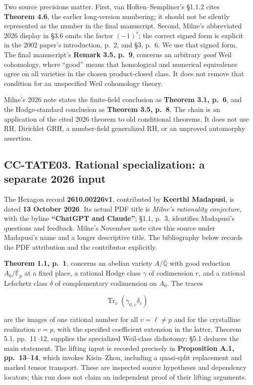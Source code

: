 Two source precisions matter. First, van Hoften--Sempliner's §1.1.2
cites \textbf{Theorem 4.6}, the earlier long-version numbering; it
should not be silently represented as the number in the final
manuscript. Second, Milne's abbreviated 2026 display in §3.6 omits the
factor \((-1)^r\); the correct signed form is explicit in the 2002
paper's introduction, p.~2, and §3, p.~6. We use that signed form. The
final manuscript's \textbf{Remark 3.5, p.~9}, concerns an arbitrary
\emph{good} Weil cohomology, where ``good'' means that homological and
numerical equivalence agree on all varieties in the chosen
product-closed class. It does not remove that condition for an
unspecified Weil cohomology theory.

Milne's 2026 note states the finite-field conclusion as \textbf{Theorem
3.1, p.~6}, and the Hodge-standard conclusion as \textbf{Theorem 3.5,
p.~8}. The chain is an application of the cited 2026 theorem to old
conditional theorems. It does not use RH, Dirichlet GRH, a number-field
generalized RH, or an unproved automorphy assertion.

\subsection{CC-TATE03. Rational specialization: a separate 2026
input}\label{cc-tate03.-rational-specialization-a-separate-2026-input}

The Hexagon record \textbf{2610.00226v1}, contributed by \textbf{Keerthi
Madapusi}, is dated \textbf{13 October 2026}. Its actual PDF title is
\emph{Milne's rationality conjecture}, with the byline \textbf{``ChatGPT
and Claude''}; §1.1, p.~3, identifies Madapusi's questions and feedback.
Milne's November note cites this source under Madapusi's name and a
longer descriptive title. The bibliography below records the PDF
attribution and the contributor explicitly.

\textbf{Theorem 1.1, p.~1}, concerns an abelian variety
\(A/\overline{\mathbb Q}\) with good reduction
\(A_0/\overline{\mathbb F}_p\) at a fixed place, a rational Hodge class
\(\gamma\) of codimension \(r\), and a rational Lefschetz class
\(\delta\) of complementary codimension on \(A_0\). The traces

\[
\operatorname{Tr}_v(\gamma_{0,v}\delta_v)
\]

are the images of one rational number for all \(v=\ell\ne p\) and for
the crystalline realization \(v=p\), with the specified coefficient
extension in the latter. Theorem 5.1, pp.~11--12, supplies the
specialized Weil-class dichotomy; §5.1 deduces the main statement. The
lifting input is recorded precisely in \textbf{Proposition A.1,
pp.~13--14}, which invokes Kisin--Zhou, including a quasi-split
replacement and marked tensor transport. These are inspected source
hypotheses and dependency locators; this run does not claim an
independent proof of their lifting arguments.

